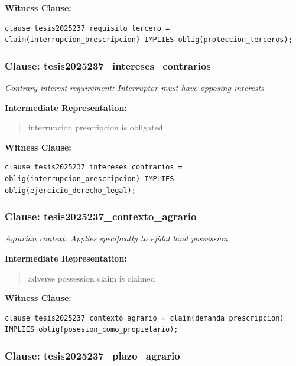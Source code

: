 \documentclass[11pt,a4paper]{article}
\begin{document}
\textbf{Witness Clause:}

\begin{lstlisting}[style=witnessstyle, language=Witness]
clause tesis2025237_requisito_tercero = claim(interrupcion_prescripcion) IMPLIES oblig(proteccion_terceros);
\end{lstlisting}

\subsubsection{Clause: tesis2025237\_intereses\_contrarios}

\textit{Contrary interest requirement: Interruptor must have opposing interests}

\textbf{Intermediate Representation:}

\begin{quote}
interrupcion prescripcion is obligated
\end{quote}

\textbf{Witness Clause:}

\begin{lstlisting}[style=witnessstyle, language=Witness]
clause tesis2025237_intereses_contrarios = oblig(interrupcion_prescripcion) IMPLIES oblig(ejercicio_derecho_legal);
\end{lstlisting}

\subsubsection{Clause: tesis2025237\_contexto\_agrario}

\textit{Agrarian context: Applies specifically to ejidal land possession}

\textbf{Intermediate Representation:}

\begin{quote}
adverse possession claim is claimed
\end{quote}

\textbf{Witness Clause:}

\begin{lstlisting}[style=witnessstyle, language=Witness]
clause tesis2025237_contexto_agrario = claim(demanda_prescripcion) IMPLIES oblig(posesion_como_propietario);
\end{lstlisting}

\subsubsection{Clause: tesis2025237\_plazo\_agrario}
\end{document}
